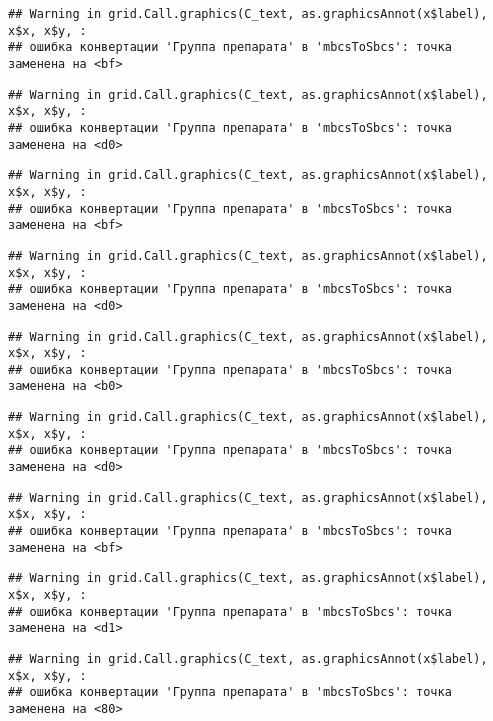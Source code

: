 \documentclass[
]{article}
\begin{document}
\begin{verbatim}
## Warning in grid.Call.graphics(C_text, as.graphicsAnnot(x$label), x$x, x$y, :
## ошибка конвертации 'Группа препарата' в 'mbcsToSbcs': точка заменена на <bf>
\end{verbatim}

\begin{verbatim}
## Warning in grid.Call.graphics(C_text, as.graphicsAnnot(x$label), x$x, x$y, :
## ошибка конвертации 'Группа препарата' в 'mbcsToSbcs': точка заменена на <d0>
\end{verbatim}

\begin{verbatim}
## Warning in grid.Call.graphics(C_text, as.graphicsAnnot(x$label), x$x, x$y, :
## ошибка конвертации 'Группа препарата' в 'mbcsToSbcs': точка заменена на <bf>
\end{verbatim}

\begin{verbatim}
## Warning in grid.Call.graphics(C_text, as.graphicsAnnot(x$label), x$x, x$y, :
## ошибка конвертации 'Группа препарата' в 'mbcsToSbcs': точка заменена на <d0>
\end{verbatim}

\begin{verbatim}
## Warning in grid.Call.graphics(C_text, as.graphicsAnnot(x$label), x$x, x$y, :
## ошибка конвертации 'Группа препарата' в 'mbcsToSbcs': точка заменена на <b0>
\end{verbatim}

\begin{verbatim}
## Warning in grid.Call.graphics(C_text, as.graphicsAnnot(x$label), x$x, x$y, :
## ошибка конвертации 'Группа препарата' в 'mbcsToSbcs': точка заменена на <d0>
\end{verbatim}

\begin{verbatim}
## Warning in grid.Call.graphics(C_text, as.graphicsAnnot(x$label), x$x, x$y, :
## ошибка конвертации 'Группа препарата' в 'mbcsToSbcs': точка заменена на <bf>
\end{verbatim}

\begin{verbatim}
## Warning in grid.Call.graphics(C_text, as.graphicsAnnot(x$label), x$x, x$y, :
## ошибка конвертации 'Группа препарата' в 'mbcsToSbcs': точка заменена на <d1>
\end{verbatim}

\begin{verbatim}
## Warning in grid.Call.graphics(C_text, as.graphicsAnnot(x$label), x$x, x$y, :
## ошибка конвертации 'Группа препарата' в 'mbcsToSbcs': точка заменена на <80>
\end{verbatim}
\end{document}
